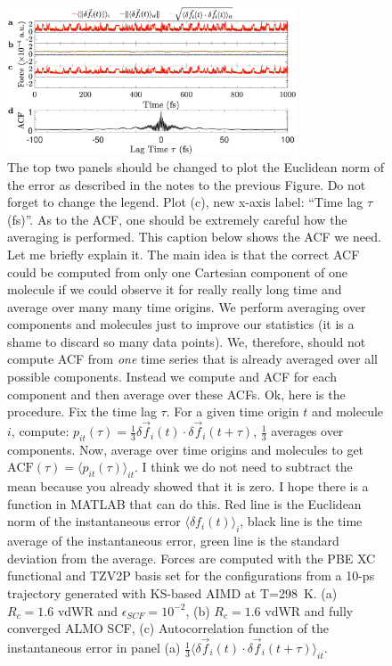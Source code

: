 \documentclass[aps,prl,reprint,amsmath,amssymb]{revtex4-1}
\begin{document}
\begin{figure}
\includegraphics[trim={0.6cm 0.7cm 0.7cm 0.3cm},clip,width=8.6cm]{DeltaForceComparison_with_ACF.eps}
\caption{\label{fig:randomforce} {\color{red} The top two panels should be changed to plot the Euclidean norm of the error as described in the notes to the previous Figure. Do not forget to change the legend. Plot (c), new x-axis label: ``Time lag $\tau$ (fs)''. As to the ACF, one should be extremely careful how the averaging is performed. This caption below shows the ACF we need. Let me briefly explain it. The main idea is that the correct ACF could be computed from only one Cartesian component of one molecule if we could observe it for really really long time and average over many many time origins. We perform averaging over components and molecules just to improve our statistics (it is a shame to discard so many data points). We, therefore, should not compute ACF from \emph{one} time series that is already averaged over all possible components. Instead we compute and ACF for each component and then average over these ACFs. Ok, here is the procedure. Fix the time lag $\tau$. For a given time origin $t$ and molecule $i$, compute: $p_{it}(\tau)=\frac{1}{3}\delta \vec{f}_i (t)\cdot \delta \vec{f}_i (t+\tau)$, $\frac{1}{3}$ averages over components. Now, average over time origins and molecules to get $\text{ACF}(\tau) = \langle p_{it}(\tau) \rangle_{it}$. I think we do not need to subtract the mean because you already showed that it is zero. I hope there is a function in MATLAB that can do this.} 
Red line is the Euclidean norm of the instantaneous error $\langle \delta f_i(t) \rangle_i$, black line is the time average of the instantaneous error, green line is the standard deviation from the average. Forces are computed with the PBE XC functional and TZV2P basis set for the configurations from a 10-ps trajectory generated with KS-based AIMD at T=298~K. 
(a) $R_{c} = 1.6$ vdWR and $\epsilon_{SCF} = 10^{-2}$, 
(b) $R_{c} = 1.6$ vdWR and fully converged ALMO SCF,
(c) Autocorrelation function of the instantaneous error in panel (a) $\frac{1}{3}\langle \delta \vec{f}_i (t) \cdot \delta\vec{f}_i(t+\tau) \rangle_{it} $.
}
\end{figure}
\end{document}
